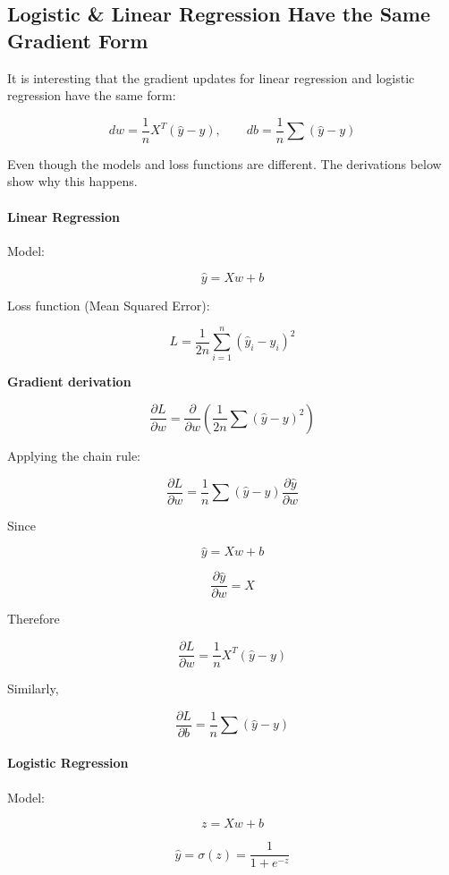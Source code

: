 \documentclass[10pt,a4paper]{article}
\begin{document}
	\subsection{Logistic  \& Linear Regression Have the Same Gradient Form}

	It is interesting that the gradient updates for linear regression and logistic regression have the same form:

	\[
	dw = \frac{1}{n}X^T(\hat{y}-y),
	\qquad
	db = \frac{1}{n}\sum(\hat{y}-y)
	\]

	Even though the models and loss functions are different.
	The derivations below show why this happens.

	\paragraph{Linear Regression}

	Model:

	\[
	\hat{y} = Xw + b
	\]

	Loss function (Mean Squared Error):

	\[
	L = \frac{1}{2n}\sum_{i=1}^{n} (\hat{y}_i - y_i)^2
	\]

	\textbf{Gradient derivation}

	\[
	\frac{\partial L}{\partial w}
	=
	\frac{\partial}{\partial w}
	\left(
	\frac{1}{2n}\sum (\hat{y}-y)^2
	\right)
	\]

	Applying the chain rule:

	\[
	\frac{\partial L}{\partial w}
	=
	\frac{1}{n}\sum (\hat{y}-y)
	\frac{\partial \hat{y}}{\partial w}
	\]

	Since

	\[
	\hat{y} = Xw + b
	\]

	\[
	\frac{\partial \hat{y}}{\partial w} = X
	\]

	Therefore

	\[
	\frac{\partial L}{\partial w}
	=
	\frac{1}{n}X^T(\hat{y}-y)
	\]

	Similarly,

	\[
	\frac{\partial L}{\partial b}
	=
	\frac{1}{n}\sum (\hat{y}-y)
	\]

	\paragraph{Logistic Regression}

	Model:

	\[
	z = Xw + b
	\]

	\[
	\hat{y} = \sigma(z) = \frac{1}{1+e^{-z}}
	\]
\end{document}
